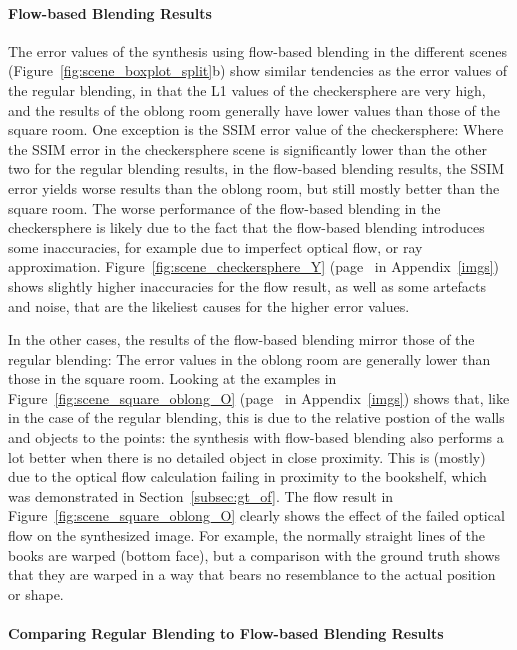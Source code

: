 \paragraph{Flow-based Blending Results}
The error values of the synthesis using flow-based blending in the different scenes (Figure~\ref{fig:scene_boxplot_split}b) show similar tendencies as the error values of the regular blending, in that the L1 values of the checkersphere are very high, and the results of the oblong room generally have lower values than those of the square room. One exception is the SSIM error value of the checkersphere: Where the SSIM error in the checkersphere scene is significantly lower than the other two for the regular blending results, in the flow-based blending results, the SSIM error yields worse results than the oblong room, but still mostly better than the square room. The worse performance of the flow-based blending in the checkersphere is likely due to the fact that the flow-based blending introduces some inaccuracies, for example due to imperfect optical flow, or ray approximation. Figure~\ref{fig:scene_checkersphere_Y} (page~\pageref{fig:scene_checkersphere_Y} in Appendix~\ref{imgs}) shows slightly higher inaccuracies for the flow result, as well as some artefacts and noise, that are the likeliest causes for the higher error values.

In the other cases, the results of the flow-based blending mirror those of the regular blending: The error values in the oblong room are generally lower than those in the square room. Looking at the examples in Figure~\ref{fig:scene_square_oblong_O} (page~\pageref{fig:scene_square_oblong_O} in Appendix~\ref{imgs}) shows that, like in the case of the regular blending, this is due to the relative postion of the walls and objects to the points: the synthesis with flow-based blending also performs a lot better when there is no detailed object in close proximity. This is (mostly) due to the optical flow calculation failing in proximity to the bookshelf, which was demonstrated in Section~\ref{subsec:gt_of}.
The flow result in Figure~\ref{fig:scene_square_oblong_O} clearly shows the effect of the failed optical flow on the synthesized image. For example, the normally straight lines of the books are warped (bottom face), but a comparison with the ground truth shows that they are warped in a way that bears no resemblance to the actual position or shape.

\paragraph{Comparing Regular Blending to Flow-based Blending Results}

